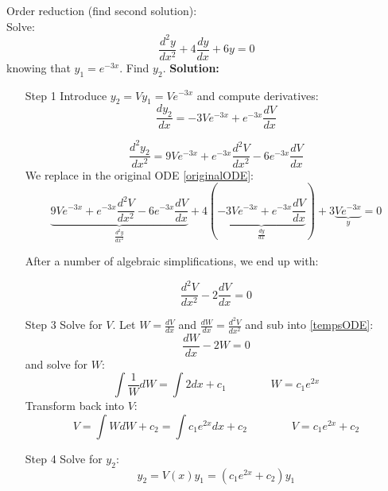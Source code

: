 \begin{exmp}{Order reduction (find second solution):}\\
Solve:
\begin{equation*}
\frac{d^2y}{dx^2}+4\frac{dy}{dx} + 6y=0
\label{originalODE}
\end{equation*}
knowing that $y_1=e^{-3x}$. Find $y_2$.
\clearpage
\textbf{Solution:}
\begin{itemize}
\item[Step 1] Introduce $y_2=Vy_1= Ve^{-3x}$ and compute derivatives:
\begin{equation*}
\frac{dy_2}{dx}=-3 Ve^{-3x}+e^{-3x}\frac{dV}{dx}
\end{equation*}

\begin{equation*}
\frac{d^2y_2}{dx^2}=9 Ve^{-3x} +  e^{-3x}\frac{d^2V}{dx^2}-6e^{-3x}\frac{dV}{dx}
\end{equation*}
We replace in the original ODE \eqref{originalODE}:
\begin{equation*}
\underbrace{9 Ve^{-3x} +  e^{-3x}\frac{d^2V}{dx^2}-6e^{-3x}\frac{dV}{dx}}_{\frac{d^2y}{dx^2}}+4\left(\underbrace{-3 Ve^{-3x}+e^{-3x}\frac{dV}{dx}}_{\frac{dy}{dx}}\right) + 3\underbrace{Ve^{-3x}}_y=0
\end{equation*}

After a number of algebraic simplifications, we end up with:

\begin{equation*}
\boxed{\frac{d^2V}{dx^2}-2\frac{dV}{dx}=0}
\label{tempsODE}
\end{equation*}
\item[Step 3] Solve for $V$. Let $W=\frac{dV}{dx}$  and $\frac{dW}{dx}=\frac{d^2V}{dx^2}$  and sub into \eqref{tempsODE}:
\begin{equation*}
\frac{dW}{dx}-2W=0
\end{equation*}
and solve for $W$:
\begin{equation*}
\int \frac{1}{W}dW=\int2 dx+c_1 \qquad \qquad W=c_1e^{2x}
\end{equation*}
Transform back into $V$:
\begin{equation}
V=\int W dW+c_2=\int c_1 e^{2x}dx +c_2 \qquad \qquad V=c_1e^{2x}+c_2
\end{equation}
\item[Step 4] Solve for $y_2$:
\begin{equation}
y_2 = V(x) y_1 = (c_1e^{2x}+c_2)y_1
\end{equation}


\end{itemize}
\end{exmp}
